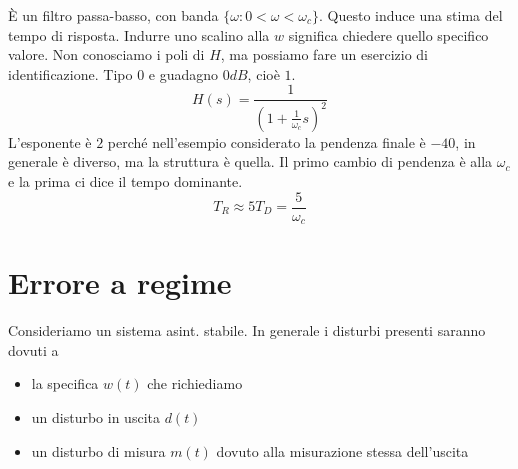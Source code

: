 \begin{figure}[htpb]
\begin{tikzpicture}[x=0.75pt,y=0.75pt,yscale=-1,xscale=1]
		
	\end{tikzpicture}
\end{figure}\FloatBarrier

È un filtro passa-basso, con banda $\{\omega :0< \omega < \omega _c\}$. Questo induce una stima del tempo di risposta. Indurre uno scalino alla $w$ significa chiedere quello specifico valore. Non conosciamo i poli di $H$, ma possiamo fare un esercizio di identificazione. Tipo $0$ e guadagno $0 \si{dB}$, cioè $1$.
\begin{equation*}
	H(s) =\frac{1}{\left(1+\frac{1}{\omega _c} s\right)^2}
\end{equation*}
L'esponente è $2$ perché nell'esempio considerato la pendenza finale è $-40$, in generale è diverso, ma la struttura è quella. Il primo cambio di pendenza è alla $\omega _c$ e la prima ci dice il tempo dominante.
\begin{equation*}
	\boxed{T_R \approx 5T_D =\frac{5}{\omega _c}}
\end{equation*}

\section{Errore a regime}

Consideriamo un sistema asint. stabile. In generale i disturbi presenti saranno dovuti a
\begin{itemize}
	\item la specifica $w(t)$ che richiediamo
	\item un disturbo in uscita $d(t)$
	\item un disturbo di misura $m(t)$ dovuto alla misurazione stessa dell'uscita
\end{itemize}

